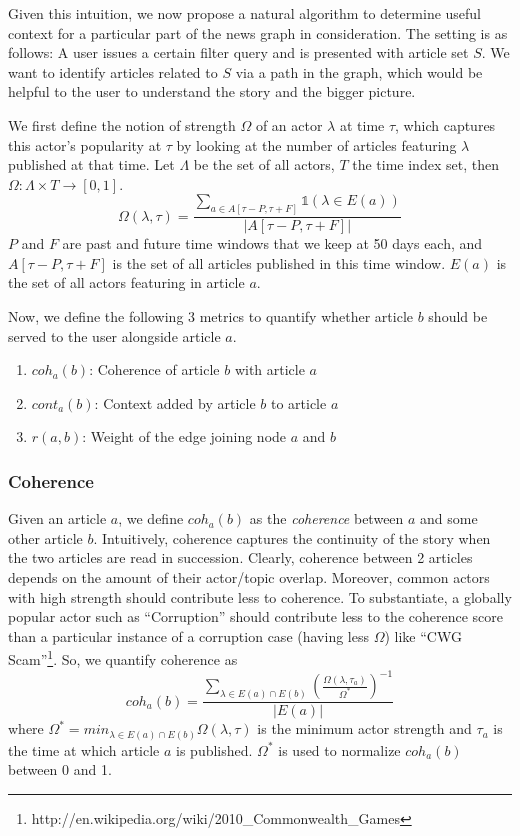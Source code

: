 Given this intuition, we now propose a natural algorithm to determine useful context for a particular part of
the news graph in consideration. The setting is as follows: A user issues a certain filter query and is presented with article set $S$. We want to identify articles
related to $S$ via a path in the graph, which would be helpful to the user to understand the story and the bigger picture.

We first define the notion of strength $\Omega$ of an actor $\lambda$ at time $\tau$, which captures this actor's popularity at $\tau$ by looking at the number of articles featuring $\lambda$ published at that time.
Let $\Lambda$ be the set of all actors, $T$ the time index set, then $\Omega : \Lambda \times T \rightarrow [0,1]$. 
\begin{equation}
\Omega(\lambda, \tau) = \frac{\sum_{a \in A[\tau - P, \tau + F]}{\mathbb{1}(\lambda \in E(a))}}{|A[\tau - P, \tau + F]|}
\end{equation}
$P$ and $F$ are past and future time windows that we keep at 50 days each, and $A[\tau - P, \tau + F]$ is the set of all articles published in this time window. $E(a)$ is the set of all actors featuring in article $a$.

Now, we define the following 3 metrics to quantify whether article $b$ should be served to the user alongside article $a$.
\begin{enumerate}
\item $coh_a(b)$: Coherence of article $b$ with article $a$
\item $cont_a(b)$: Context added by article $b$ to article $a$ 
\item $r(a, b)$: Weight of the edge joining node $a$ and $b$
\end{enumerate}

\subsubsection*{Coherence}
Given an article $a$, we define $coh_{a}(b)$ as the \emph{coherence} between $a$ and some other article $b$. Intuitively, coherence captures the continuity of the story when the two articles are read in succession.
Clearly, coherence between 2 articles depends on the amount of their actor/topic overlap. Moreover, common actors with high strength should contribute less to coherence. To substantiate, a globally popular actor such as ``Corruption'' should contribute less to the coherence score
than a particular instance of a corruption case (having less $\Omega$) like ``CWG Scam''\footnote{http://en.wikipedia.org/wiki/2010\_Commonwealth\_Games}. So, we quantify coherence as
\begin{equation}
coh_{a}(b) = \frac{\sum_{\lambda \in E(a) \cap E(b)}{(\frac{\Omega(\lambda, \tau_a)}{\Omega^{*}})^{-1}}}{|E(a)|}
\end{equation}
where $\Omega^{*}=min_{\lambda \in E(a) \cap E(b)}{\Omega(\lambda, \tau)}$ is the minimum actor strength and $\tau_a$ is the time at which article $a$ is published. 
$\Omega^{*}$ is used to normalize $coh_a(b)$ between 0 and 1.

